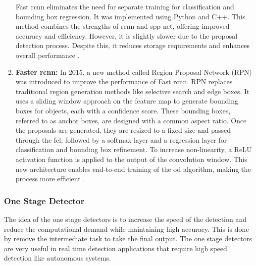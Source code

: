 \begin{enumerate}
    Fast \gls{rcnn} eliminates the need for separate training for classification and bounding box regression. It was implemented using Python and C++. This method combines the strengths of \gls{rcnn} and \gls{spp-net}, offering improved accuracy and efficiency. However, it is slightly slower due to the proposal detection process. Despite this, it reduces storage requirements and enhances overall performance \cite{oD_Review}.


    \item \textbf{Faster \gls{rcnn}:} In 2015, a new method called Region Proposal Network (RPN) was introduced to improve the performance of Fast \gls{rcnn}. RPN replaces traditional region generation methods like selective search and edge boxes. It uses a sliding window approach on the feature map to generate bounding boxes for objects, each with a confidence score. These bounding boxes, referred to as anchor boxes, are designed with a common aspect ratio. Once the proposals are generated, they are resized to a fixed size and passed through the \gls{fcl}, followed by a softmax layer and a regression layer for classification and bounding box refinement. To increase non-linearity, a ReLU activation function is applied to the output of the convolution window. This new architecture enables end-to-end training of the \gls{od} algorithm, making the process more efficient \cite{oD_Review}.
\end{enumerate}

\subsubsection{One Stage Detector}
The idea of the one stage detectors is to increase the speed of the detection and reduce the computational demand while maintaining high accuracy. This is done by remove the intermediate task to take the final output. The one stage detectors are very useful in real time detection applications that require high speed detection like autonomous systems.

